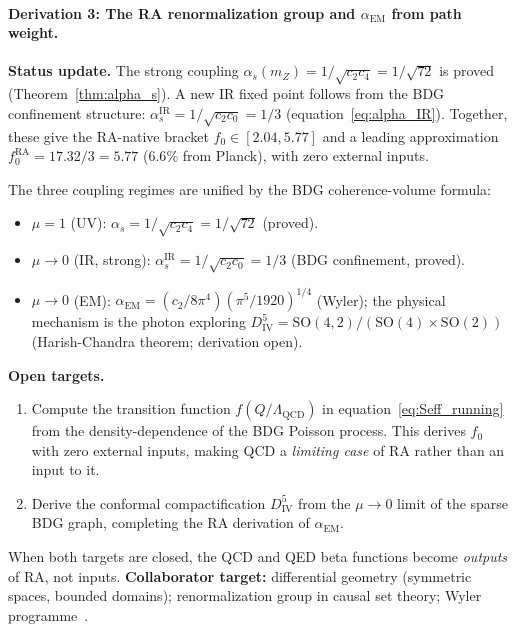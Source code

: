 \documentclass[11pt,a4paper]{article}
\begin{document}
\paragraph{Derivation 3: The RA renormalization group and $\alpha_{\mathrm{EM}}$ from path weight.}

\textbf{Status update.}
The strong coupling $\alpha_s(m_Z) = 1/\sqrt{c_2 c_4} = 1/\sqrt{72}$ is
proved (Theorem~\ref{thm:alpha_s}).  A new IR fixed point follows from the
BDG confinement structure:
$\alpha_s^{\mathrm{IR}} = 1/\sqrt{c_2 c_0} = 1/3$ (equation~\eqref{eq:alpha_IR}).
Together, these give the RA-native bracket $f_0 \in [2.04, 5.77]$ and a
leading approximation $f_0^{\mathrm{RA}} = 17.32/3 = 5.77$ ($6.6\%$ from
Planck), with zero external inputs.

The three coupling regimes are unified by the BDG coherence-volume formula:
\begin{itemize}[noitemsep]
\item $\mu=1$ (UV): $\alpha_s = 1/\sqrt{c_2 c_4} = 1/\sqrt{72}$ (proved).
\item $\mu\to 0$ (IR, strong): $\alpha_s^{\mathrm{IR}} = 1/\sqrt{c_2 c_0} = 1/3$
  (BDG confinement, proved).
\item $\mu\to 0$ (EM): $\alpha_{\mathrm{EM}} = (c_2/8\pi^4)(\pi^5/1920)^{1/4}$
  (Wyler); the physical mechanism is the photon exploring
  $D_{\mathrm{IV}}^5 = \mathrm{SO}(4,2)/(\mathrm{SO}(4)\times\mathrm{SO}(2))$
  (Harish-Chandra theorem; derivation open).
\end{itemize}

\textbf{Open targets.}
\begin{enumerate}[noitemsep,label=\roman*.]
\item Compute the transition function $f(Q/\Lambda_{\mathrm{QCD}})$ in
  equation~\eqref{eq:Seff_running} from the density-dependence of the
  BDG Poisson process.  This derives $f_0$ with zero external inputs,
  making QCD a \emph{limiting case} of RA rather than an input to it.
\item Derive the conformal compactification $D_{\mathrm{IV}}^5$ from the
  $\mu\to 0$ limit of the sparse BDG graph, completing the RA derivation
  of $\alpha_{\mathrm{EM}}$.
\end{enumerate}
When both targets are closed, the QCD and QED beta functions become
\emph{outputs} of RA, not inputs.
\textbf{Collaborator target:} differential geometry (symmetric spaces,
bounded domains); renormalization group in causal set theory; Wyler
programme~\citep{Wyler1969}.
\end{document}
